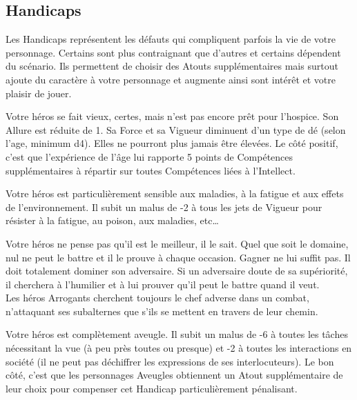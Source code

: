 \subsection{Handicaps}

Les Handicaps représentent les défauts qui compliquent parfois la vie de votre personnage. Certains sont plus contraignant que d’autres et certains dépendent du scénario. Ils permettent de choisir des Atouts supplémentaires mais surtout ajoute du caractère à votre personnage et augmente ainsi sont intérêt et votre plaisir de jouer.

\begin{description}[align=left]
    \item [Âgé (Majeur)]
        Votre héros se fait vieux, certes, mais n’est pas encore prêt pour l’hospice. Son Allure est réduite de 1. Sa Force et sa Vigueur diminuent d’un type de dé (selon l’age, minimum d4). Elles ne pourront plus jamais être élevées. Le côté positif, c’est que l’expérience de l’âge lui rapporte 5 points de Compétences supplémentaires à répartir sur toutes Compétences liées à l’Intellect.

    \item [Anémique (Mineur)]
        Votre héros est particulièrement sensible aux maladies, à la fatigue et aux effets de l’environnement. Il subit un malus de -2 à tous les jets de Vigueur pour résister à la fatigue, au poison, aux maladies, etc\ldots

    \item [Arrogant (Majeur)]
        Votre héros ne pense pas qu’il est le meilleur, il le sait. Quel que soit le domaine, nul ne peut le battre et il le prouve à chaque occasion. Gagner ne lui suffit pas. Il doit totalement dominer son adversaire. Si un adversaire doute de sa supériorité, il cherchera à l’humilier et à lui prouver qu’il peut le battre quand il veut.\\
        Les héros Arrogants cherchent toujours le chef adverse dans un combat, n’attaquant ses subalternes que s’ils se mettent en travers de leur chemin.

    \item [Aveugle (Majeur)]
        Votre héros est complètement aveugle. Il subit un malus de -6 à toutes les tâches nécessitant la vue (à peu près toutes ou presque) et -2 à toutes les interactions en société (il ne peut pas déchiffrer les expressions de ses interlocuteurs). Le bon côté, c’est que les personnages Aveugles obtiennent un Atout supplémentaire de leur choix pour compenser cet Handicap particulièrement pénalisant.


\end{description}
